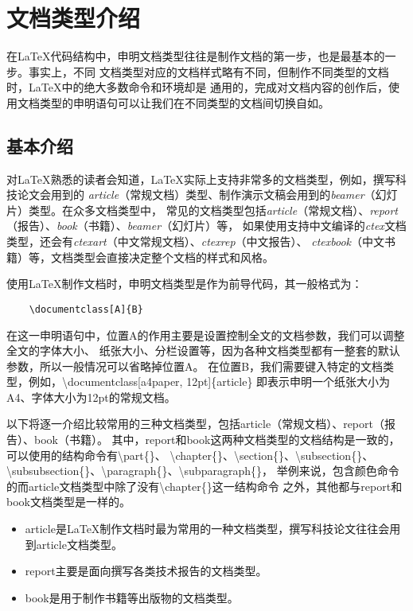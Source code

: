 \section{文档类型介绍}
在LaTeX代码结构中，申明文档类型往往是制作文档的第一步，也是最基本的一步。事实上，不同
文档类型对应的文档样式略有不同，但制作不同类型的文档时，LaTeX中的绝大多数命令和环境却是
通用的，完成对文档内容的创作后，使用文档类型的申明语句可以让我们在不同类型的文档间切换自如。

\subsection{基本介绍}
对LaTeX熟悉的读者会知道，LaTeX实际上支持非常多的文档类型，例如，撰写科技论文会用到的
\emph{article}（常规文档）类型、制作演示文稿会用到的\emph{beamer}（幻灯片）类型。在众多文档类型中，
常见的文档类型包括\emph{article}（常规文档）、\emph{report}（报告）、\emph{book}（书籍）、\emph{beamer}（幻灯片）等，
如果使用支持中文编译的\emph{ctex}文档类型，还会有\emph{ctexart}（中文常规文档）、\emph{ctexrep}（中文报告）、
\emph{ctexbook}（中文书籍）等，文档类型会直接决定整个文档的样式和风格。

使用LaTeX制作文档时，申明文档类型是作为前导代码，其一般格式为：
\begin{lstlisting}
    \documentclass[A]{B}
\end{lstlisting}

在这一申明语句中，位置A的作用主要是设置控制全文的文档参数，我们可以调整全文的字体大小、
纸张大小、分栏设置等，因为各种文档类型都有一整套的默认参数，所以一般情况可以省略掉位置A。
在位置B，我们需要键入特定的文档类型，例如，\textbackslash documentclass[a4paper, 12pt]\{article\}
即表示申明一个纸张大小为A4、字体大小为12pt的常规文档。

以下将逐一介绍比较常用的三种文档类型，包括article（常规文档）、report（报告）、book（书籍）。
其中，report和book这两种文档类型的文档结构是一致的，可以使用的结构命令有\textbackslash part\{\}、
\textbackslash chapter\{\}、\textbackslash section\{\}、\textbackslash subsection\{\}、
\textbackslash subsubsection\{\}、\textbackslash paragraph\{\}、\textbackslash subparagraph\{\}，
举例来说，包含颜色命令的而article文档类型中除了没有\textbackslash chapter\{\}这一结构命令
之外，其他都与report和book文档类型是一样的。

\begin{itemize}
    \item article是LaTeX制作文档时最为常用的一种文档类型，撰写科技论文往往会用到article文档类型。
    \item report主要是面向撰写各类技术报告的文档类型。
    \item book是用于制作书籍等出版物的文档类型。
\end{itemize}

